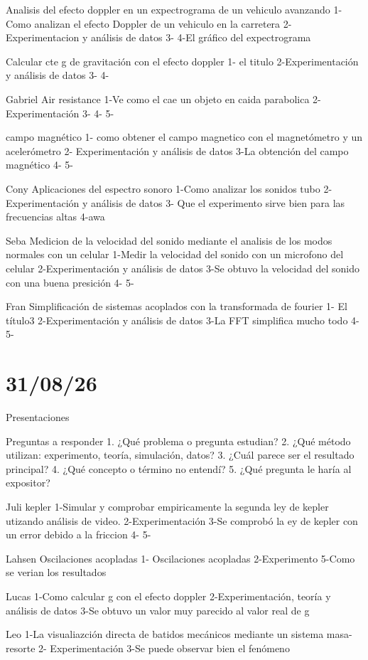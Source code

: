 \documentclass{article}
\begin{document}
Analisis del efecto doppler en un expectrograma de un vehiculo avanzando
1-Como analizan el efecto Doppler de un vehiculo en la carretera
2-Experimentacion y análisis de datos
3-
4-El gráfico del expectrograma

Calcular cte g de gravitación con el efecto doppler
1- el titulo
2-Experimentación  y análisis de datos
3-
4-

Gabriel
Air resistance
1-Ve como el cae un objeto en caida parabolica
2-Experimentación 
3-
4-
5-

campo magnético
1- como obtener el campo magnetico con el magnetómetro y un acelerómetro
2- Experimentación y análisis de datos
3-La obtención del campo magnético
4-
5-

Cony
Aplicaciones del espectro sonoro
1-Como analizar los sonidos tubo
2-Experimentación y análisis de datos
3- Que el experimento sirve bien para las frecuencias altas
4-awa


Seba
Medicion de la velocidad del sonido mediante el analisis de los modos normales con un celular
1-Medir la velocidad del sonido con un microfono del celular
2-Experimentación y análisis de datos
3-Se obtuvo la velocidad del sonido con una buena presición
4-
5-

Fran
Simplificación de sistemas acoplados con la transformada de fourier
1- El título3
2-Experimentación y análisis de datos
3-La FFT simplifica mucho todo
4-
5-


\section{31/08/26}
Presentaciones

Preguntas a responder
1. ¿Qué problema o pregunta estudian?
2. ¿Qué método utilizan: experimento, teoría, simulación, datos?
3. ¿Cuál parece ser el resultado principal?
4. ¿Qué concepto o término no entendí?
5. ¿Qué pregunta le haría al expositor?

Juli
kepler
1-Simular y comprobar empiricamente la segunda ley de kepler utizando análisis de video.
2-Experimentación
3-Se comprobó la ey de kepler con un error debido a la friccion
4-
5-

Lahsen
Oscilaciones acopladas
1- Oscilaciones acopladas
2-Experimento
5-Como se verian los resultados


Lucas
1-Como calcular g con el efecto doppler
2-Experimentación, teoría y análisis de datos
3-Se obtuvo un valor muy parecido al valor real de g

Leo
1-La visualiazción directa de batidos mecánicos mediante un sistema masa-resorte
2- Experimentación
3-Se puede observar bien el fenómeno
\end{document}
